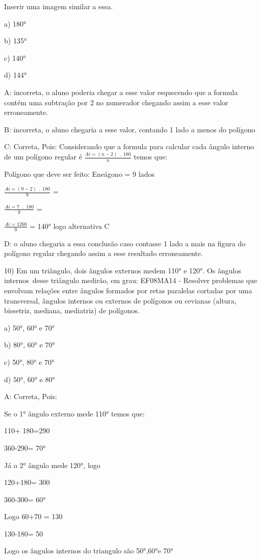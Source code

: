 Inserir uma imagem similar a essa.

a) 180°

b) 135°

c) 140°

d) 144°

A: incorreta, o aluno poderia chegar a esse valor esquecendo que a
formula contém uma subtração por 2 no numerador chegando assim a esse
valor erroneamente.

B: incorreta, o aluno chegaria a esse valor, contando 1 lado a menos do
polígono

C: Correta, Pois: Considerando que a formula para calcular cada ângulo
interno de um polígono regular é
\(\frac{Ai = \left( n - 2 \right)\ \ .\ \ 180}{n}\) temos que:

Polígono que deve ser feito: Eneágono = 9 lados

\(\frac{Ai = \left( 9 - 2 \right)\ \ .\ \ 180}{9}\) =

\(\frac{Ai = 7\ \ \ .\ \ 180}{9}\) =

\(\frac{Ai = 1260}{9}\) = 140° logo alternativa C

D: o aluno chegaria a essa conclusão caso contasse 1 lado a mais na
figura do polígono regular chegando assim a esse resultado erroneamente.

10) Em um triângulo, dois ângulos externos medem 110° e 120°. Os ângulos
internos~desse triângulo medirão, em grau: EF08MA14 - Resolver problemas
que envolvam relações entre ângulos formados por retas paralelas
cortadas por uma transversal, ângulos internos ou externos de polígonos
ou cevianas (altura, bissetriz, mediana, mediatriz) de polígonos.

a) 50°, 60° e 70°

b) 80°, 60° e 70°

c) 50°, 80° e 70°

d) 50°, 60° e 80°

A: Correta, Pois:

Se o 1° ângulo externo mede 110° temos que:

110+ 180=290

360-290= 70°

Já o 2° ângulo mede 120°, logo

120+180= 300

360-300= 60°

Logo 60+70 = 130

130-180= 50

Logo os ângulos internos do triangulo são 50°,60°e 70°

